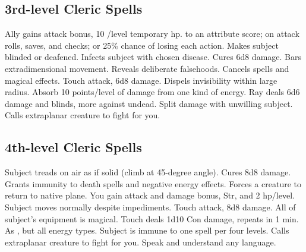 \subsection{3rd-level Cleric Spells}
\begin{spelllist}
   Ally gains  attack bonus, 10 /level temporary hp.
    to an attribute score;  on attack rolls, saves, and checks; or 25\% chance of losing each action.
   Makes subject blinded or deafened.
   Infects subject with chosen disease.
   Cures 6d8 damage.
   Bars extradimensional movement.
   Reveals deliberate falsehoods.
   Cancels spells and magical effects.
   Touch attack, 6d8 damage.
   Dispels invisibility within large radius.
   Absorb 10 points/level of damage from one kind of energy.
   Ray deals 6d6 damage and blinds, more against undead.
    Split damage with unwilling subject.
   Calls extraplanar creature to fight for you.
\end{spelllist}

\subsection{4th-level Cleric Spells}
\begin{spelllist}
   Subject treads on air as if solid (climb at 45-degree angle).
   Cures 8d8 damage.
   Grants immunity to death spells and negative energy effects.
   Forces a creature to return to native plane.
   You gain attack and damage bonus,  Str, and 2 hp/level.
   Subject moves normally despite impediments.
   Touch attack, 8d8 damage.
   All of subject's equipment is magical.
   Touch deals 1d10 Con damage, repeats in 1 min.
   As , but all energy types.
   Subject is immune to one spell per four levels.
   Calls extraplanar creature to fight for you.
   Speak and understand any language.
\end{spelllist}

